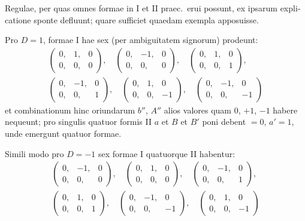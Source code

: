 \documentclass[12pt,a4paper]{article}
\theoremstyle{plain}
\theoremstyle{definition}
\theoremstyle{remark}
\begin{document}
\begin{otherlanguage}{latin}
Regulae, per quas omnes formae in I et II praec.\ erui possunt, ex ipsarum explicatione sponte defluunt; quare sufficiet quaedam exempla apposuisse.

Pro $D = 1$, formae I hae sex (per ambiguitatem signorum) prodeunt:
\begin{gather*}
\begin{pmatrix} 0, & 1, & 0 \\ 0, & 0, & 0 \end{pmatrix}, \quad
\begin{pmatrix} 0, & -1, & 0 \\ 0, & 0, & 0 \end{pmatrix}, \quad
\begin{pmatrix} 0, & 1, & 0 \\ 0, & 0, & 1 \end{pmatrix}, \\
\begin{pmatrix} 0, & -1, & 0 \\ 0, & 0, & 1 \end{pmatrix}, \quad
\begin{pmatrix} 0, & 1, & 0 \\ 0, & 0, & -1 \end{pmatrix}, \quad
\begin{pmatrix} 0, & -1, & 0 \\ 0, & 0, & -1 \end{pmatrix}
\end{gather*}
et combinationum hinc oriundarum $b''$, $A''$ alios valores quam $0$, $+1$, $-1$ habere nequeunt; pro singulis quatuor formis II $a$ et $B$ et $B'$ poni debent $= 0$, $a' = 1$, unde emergunt quatuor formae.

Simili modo pro $D = -1$ sex formae I quatuorque II habentur:
\begin{gather*}
\begin{pmatrix} 0, & -1, & 0 \\ 0, & 0, & 0 \end{pmatrix}, \quad
\begin{pmatrix} 0, & 1, & 0 \\ 0, & 0, & 0 \end{pmatrix}, \quad
\begin{pmatrix} 0, & -1, & 0 \\ 0, & 0, & 1 \end{pmatrix}, \\
\begin{pmatrix} 0, & 1, & 0 \\ 0, & 0, & 1 \end{pmatrix}, \quad
\begin{pmatrix} 0, & -1, & 0 \\ 0, & 0, & -1 \end{pmatrix}, \quad
\begin{pmatrix} 0, & 1, & 0 \\ 0, & 0, & -1 \end{pmatrix}
\end{gather*}


\end{otherlanguage}
\end{document}

